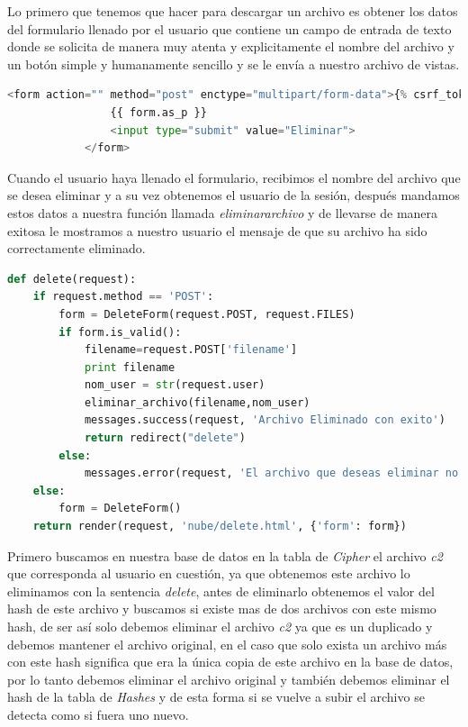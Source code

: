 Lo primero que tenemos que hacer para descargar un archivo es obtener los datos del formulario llenado por el usuario que contiene un campo de entrada de texto donde se solicita de manera muy atenta y explicitamente el nombre del archivo y un botón simple y humanamente sencillo y se le envía a nuestro archivo de vistas.

\begin{lstlisting}[language=Python,frame=single, keywordstyle=\color{blue},breaklines=true, showstringspaces=false]
            <form action="" method="post" enctype="multipart/form-data">{% csrf_token %}
                {{ form.as_p }}
                <input type="submit" value="Eliminar">
            </form>
\end{lstlisting}

Cuando el usuario haya llenado el formulario, recibimos el nombre del archivo que se desea eliminar y a su vez obtenemos el usuario de la sesión, después mandamos estos datos a nuestra función llamada \textit{eliminararchivo} y de llevarse de manera exitosa le mostramos a nuestro usuario el mensaje de que su archivo ha sido correctamente eliminado.

\begin{lstlisting}[language=Python,frame=single, keywordstyle=\color{blue},breaklines=true, showstringspaces=false]
def delete(request):
    if request.method == 'POST':
        form = DeleteForm(request.POST, request.FILES)
        if form.is_valid():
            filename=request.POST['filename']
            print filename
            nom_user = str(request.user)          
            eliminar_archivo(filename,nom_user)
            messages.success(request, 'Archivo Eliminado con exito')
            return redirect("delete")
        else:
            messages.error(request, 'El archivo que deseas eliminar no existe')
    else:
        form = DeleteForm()
    return render(request, 'nube/delete.html', {'form': form})
\end{lstlisting}

Primero buscamos en nuestra base de datos en la tabla de \textit{Cipher} el archivo \textit{c2} que corresponda al usuario en cuestión, ya que obtenemos este archivo lo eliminamos con la sentencia \textit{delete}, antes de eliminarlo obtenemos el valor del hash de este archivo y buscamos si existe mas de dos archivos con este mismo hash, de ser así solo debemos eliminar el archivo \textit{c2} ya que es un duplicado y debemos mantener el archivo original, en el caso que solo exista un archivo más con este hash significa que era la única copia de este archivo en la base de datos, por lo tanto debemos eliminar el archivo original y también debemos eliminar el hash de la tabla de \textit{Hashes} y de esta forma si se vuelve a subir el archivo se detecta como si fuera uno nuevo.


